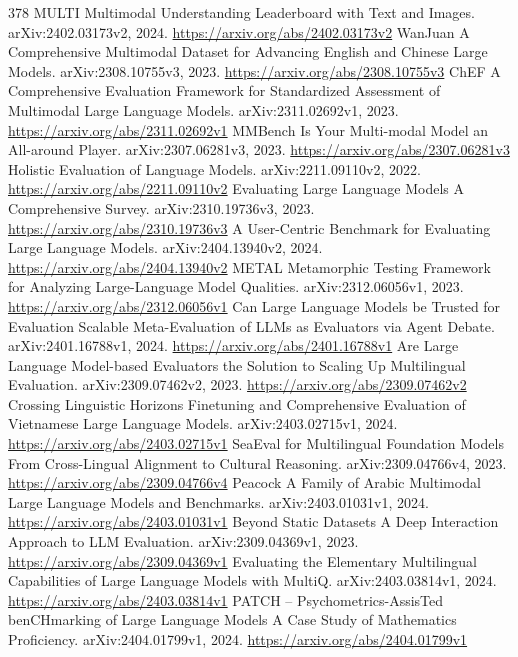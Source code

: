 \documentclass[11pt]{article}
\begin{document}
\begin{thebibliography}{378}
 MULTI Multimodal Understanding Leaderboard with Text and Images. arXiv:2402.03173v2, 2024. \url{https://arxiv.org/abs/2402.03173v2}
 WanJuan A Comprehensive Multimodal Dataset for Advancing English and Chinese Large Models. arXiv:2308.10755v3, 2023. \url{https://arxiv.org/abs/2308.10755v3}
 ChEF A Comprehensive Evaluation Framework for Standardized Assessment of Multimodal Large Language Models. arXiv:2311.02692v1, 2023. \url{https://arxiv.org/abs/2311.02692v1}
 MMBench Is Your Multi-modal Model an All-around Player. arXiv:2307.06281v3, 2023. \url{https://arxiv.org/abs/2307.06281v3}
 Holistic Evaluation of Language Models. arXiv:2211.09110v2, 2022. \url{https://arxiv.org/abs/2211.09110v2}
 Evaluating Large Language Models A Comprehensive Survey. arXiv:2310.19736v3, 2023. \url{https://arxiv.org/abs/2310.19736v3}
 A User-Centric Benchmark for Evaluating Large Language Models. arXiv:2404.13940v2, 2024. \url{https://arxiv.org/abs/2404.13940v2}
 METAL Metamorphic Testing Framework for Analyzing Large-Language Model Qualities. arXiv:2312.06056v1, 2023. \url{https://arxiv.org/abs/2312.06056v1}
 Can Large Language Models be Trusted for Evaluation Scalable Meta-Evaluation of LLMs as Evaluators via Agent Debate. arXiv:2401.16788v1, 2024. \url{https://arxiv.org/abs/2401.16788v1}
 Are Large Language Model-based Evaluators the Solution to Scaling Up Multilingual Evaluation. arXiv:2309.07462v2, 2023. \url{https://arxiv.org/abs/2309.07462v2}
 Crossing Linguistic Horizons Finetuning and Comprehensive Evaluation of Vietnamese Large Language Models. arXiv:2403.02715v1, 2024. \url{https://arxiv.org/abs/2403.02715v1}
 SeaEval for Multilingual Foundation Models From Cross-Lingual Alignment to Cultural Reasoning. arXiv:2309.04766v4, 2023. \url{https://arxiv.org/abs/2309.04766v4}
 Peacock A Family of Arabic Multimodal Large Language Models and Benchmarks. arXiv:2403.01031v1, 2024. \url{https://arxiv.org/abs/2403.01031v1}
 Beyond Static Datasets A Deep Interaction Approach to LLM Evaluation. arXiv:2309.04369v1, 2023. \url{https://arxiv.org/abs/2309.04369v1}
 Evaluating the Elementary Multilingual Capabilities of Large Language Models with MultiQ. arXiv:2403.03814v1, 2024. \url{https://arxiv.org/abs/2403.03814v1}
 PATCH -- Psychometrics-AssisTed benCHmarking of Large Language Models A Case Study of Mathematics Proficiency. arXiv:2404.01799v1, 2024. \url{https://arxiv.org/abs/2404.01799v1}

\end{thebibliography}
\end{document}
